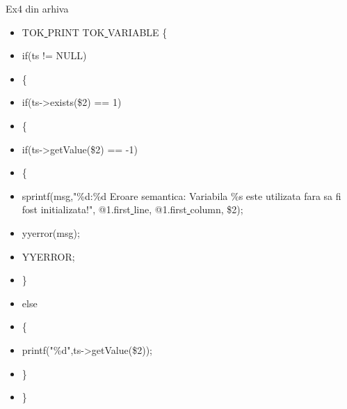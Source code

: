 \documentclass[pdf]{beamer}
\begin{document}
\begin{frame}{Ex4 din arhiva}
\begin{itemize}
\item \hspace{4mm}
 TOK\underline{ }PRINT TOK\underline{ }VARIABLE
      \{
\item \hspace{6mm}
	if(ts != NULL)
\item \hspace{6mm}
	\{
\item \hspace{6mm}
	  if(ts->exists(\$2) == 1)
\item \hspace{6mm}
	  \{
\item \hspace{8mm}
	    if(ts->getValue(\$2) == -1)
\item \hspace{8mm}
	    \{
\item \hspace{10mm}
	      sprintf(msg,"\%d:\%d Eroare semantica: Variabila \%s este utilizata fara sa fi fost initializata!", @1.first\underline{ }line, @1.first\underline{ }column, \$2);
\item \hspace{10mm}	      
	      yyerror(msg);
\item \hspace{10mm}
	      YYERROR;
\item \hspace{8mm}
	    \}
\item \hspace{8mm}
	    else
\item \hspace{8mm}
	    \{
\item \hspace{10mm}
	      printf("\%d",ts->getValue(\$2));
\item \hspace{8mm}	      
	    \}
\item \hspace{6mm}
	  \}
\end{itemize}
\end{frame}
\end{document}
